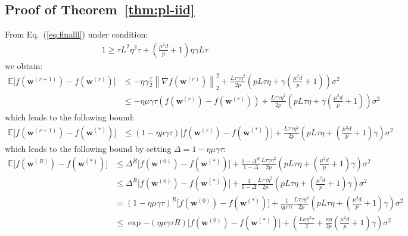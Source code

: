 \subsection{Proof of Theorem~\ref{thm:pl-iid}}
From Eq.~(\ref{eq:finalll}) under condition:
\begin{align}
       1\geq {\tau L^2\eta^2\tau}+{(\frac{\mu^2d}{p}+1)\eta\gamma L}{\tau} 
\end{align}
we obtain:
\begin{align}
         \mathbb{E}\Big[f({\boldsymbol{w}}^{(r+1)})-f({\boldsymbol{w}}^{(r)})\Big]&\leq -\eta\gamma\frac{\tau}{2}\left\|\nabla f({\boldsymbol{w}}^{(r)})\right\|_2^2+\frac{L\tau\gamma\eta^2 }{2p}\left(pL\tau\eta+\gamma(\frac{\mu^2d}{p}+1)\right)\sigma^2\nonumber\\
         &\leq -\eta\mu\gamma{\tau} \left(f({\boldsymbol{w}}^{(r)})-f({\boldsymbol{w}}^{(r)})\right)+\frac{L\tau\gamma\eta^2 }{2p}\left(pL\tau\eta+\gamma(\frac{\mu^2d}{p}+1)\right)\sigma^2 
\end{align}
which leads to the following bound:
\begin{align}
            \mathbb{E}\Big[f({\boldsymbol{w}}^{(r+1)})-f({\boldsymbol{w}}^{(*)})\Big]&\leq \left(1-\eta\mu\gamma{\tau}\right) \Big[f({\boldsymbol{w}}^{(r)})-f({\boldsymbol{w}}^{(*)})\Big]+\frac{L\tau\gamma\eta^2 }{2p}\left(pL\tau\eta+(\frac{\mu^2d}{p}+1)\gamma\right)\sigma^2
\end{align}
which leads to the following bound by setting $\Delta=1-\eta\mu\gamma{\tau}$:
\begin{align}
            \mathbb{E}\Big[f({\boldsymbol{w}}^{(R)})-f({\boldsymbol{w}}^{(*)})\Big]&\leq \Delta^R \Big[f({\boldsymbol{w}}^{(0)})-f({\boldsymbol{w}}^{(*)})\Big]+\frac{1-\Delta^R}{1-\Delta}\frac{L\tau\gamma\eta^2 }{2p}\left(pL\tau\eta+(\frac{\mu^2d}{p}+1)\gamma\right)\sigma^2\nonumber\\
            &\leq \Delta^R \Big[f({\boldsymbol{w}}^{(0)})-f({\boldsymbol{w}}^{(*)})\Big]+\frac{1}{1-\Delta}\frac{L\tau\gamma\eta^2 }{2p}\left(pL\tau\eta+(\frac{\mu^2d}{p}+1)\gamma\right)\sigma^2\nonumber\\
            &={\left(1-\eta\mu\gamma{\tau}\right)}^R \Big[f({\boldsymbol{w}}^{(0)})-f({\boldsymbol{w}}^{(*)})\Big]+\frac{1}{\eta\mu\gamma{\tau}}\frac{L\tau\gamma\eta^2 }{2p}\left(pL\tau\eta+(\frac{\mu^2d}{p}+1)\gamma\right)\sigma^2\nonumber\\
            &\leq \exp{-\left(\eta\mu\gamma{\tau} R\right)}\Big[f({\boldsymbol{w}}^{(0)})-f({\boldsymbol{w}}^{(*)})\Big]+\left(\frac{L\kappa\eta^2 \tau}{2}+\frac{\kappa\eta }{2p}(\frac{\mu^2d}{p}+1)\gamma\right)\sigma^2
\end{align}
